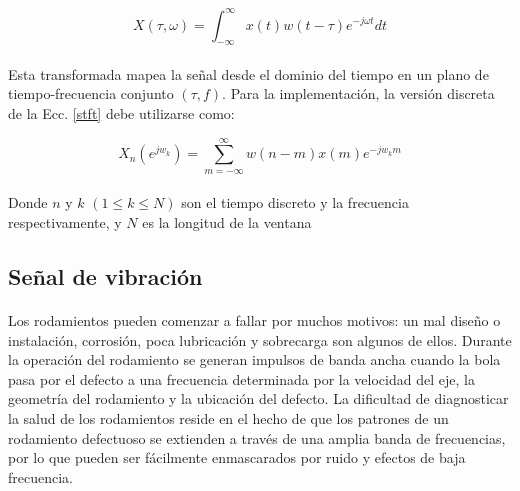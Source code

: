 \documentclass[12pt]{article}%
\begin{document}
\begin{equation}
\label{stft}
X(\tau,\omega)=\int_{-\infty}^{\infty}x(t)w(t-\tau)e^{-j\omega{t}}dt
\end{equation}

\paragraph{}
Esta transformada mapea la señal desde el dominio del tiempo en un plano de tiempo-frecuencia conjunto $(\tau,f)$. Para la implementación, la versión discreta de la Ecc. \ref{stft} debe utilizarse como:

\begin{equation}
X_{n}(e^{jw_{k}})=\sum_{m=-\infty}^{\infty}w(n-m)x(m)e^{-jw_{k}m}
\end{equation}

\paragraph{}
Donde $n$ y $k$ $(1{\leq}k{\leq}N)$ son el tiempo discreto y la frecuencia respectivamente, y $N$ es la longitud de la ventana

\subsection{Señal de vibración}
\paragraph{}
Los rodamientos pueden comenzar a fallar por muchos motivos: un mal diseño o instalación, corrosión, poca lubricación y sobrecarga son algunos de ellos. Durante la operación del rodamiento se generan impulsos de banda ancha cuando la bola pasa por el defecto a una frecuencia determinada por la velocidad del eje, la geometría del rodamiento y la ubicación del defecto. La dificultad de diagnosticar la salud de los rodamientos reside en el hecho de que los patrones de un rodamiento defectuoso se extienden a través de una amplia banda de frecuencias, por lo que pueden ser fácilmente enmascarados por ruido y efectos de baja frecuencia.
\end{document}
